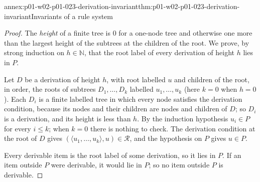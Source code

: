 \begin{annexitem}{annex:p01-w02-p01-023-derivation-invariant}{thm:p01-w02-p01-023-derivation-invariant}{Invariants of a rule system}
\begin{proof}
The \emph{height} of a finite tree is \(0\) for a one-node tree and otherwise
one more than the largest height of the subtrees at the children of the
root. We prove, by strong induction on \(h\in\mathbb N\), that the root
label of every derivation of height \(h\) lies in \(P\).

Let \(D\) be a derivation of height \(h\), with root labelled \(u\) and
children of the root, in order, the roots of subtrees \(D_1,\ldots,D_k\)
labelled \(u_1,\ldots,u_k\) (here \(k=0\) when \(h=0\)). Each \(D_i\) is a
finite labelled tree in which every node satisfies the derivation condition,
because its nodes and their children are nodes and children of \(D\); so
\(D_i\) is a derivation, and its height is less than \(h\). By the induction
hypothesis \(u_i\in P\) for every \(i\leq k\); when \(k=0\) there is nothing
to check. The derivation condition at the root of \(D\) gives
\((\langle u_1,\ldots,u_k\rangle,u)\in\mathcal R\), and the hypothesis on
\(P\) gives \(u\in P\).

Every derivable item is the root label of some derivation, so it lies in
\(P\). If an item outside \(P\) were derivable, it would lie in \(P\); so no
item outside \(P\) is derivable.
\end{proof}
\end{annexitem}

